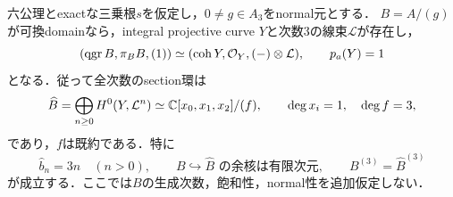 \documentclass[11pt,a4paper]{ltjsarticle}
\begin{document}
\begin{theorem}[可換三次境界の飽和環は平面三次曲線の環である]
\label{thm:v7-commutative-boundary-geometry}
六公理とexactな三乗根$s$を仮定し，$0\ne g\in A_3$をnormal元とする．
$B=A/(g)$が可換domainなら，integral projective curve $Y$と次数$3$の線束$\mathcal L$が存在し，
\begin{equation}\label{eq:v7-commutative-boundary-triple}
 (\operatorname{qgr} B,\pi_BB,(1))
 \simeq(\operatorname{coh}Y,\mathcal O_Y,(-)\otimes\mathcal L),
 \qquad p_a(Y)=1
\end{equation}
となる．従って全次数のsection環は
\[
 \widehat B=\bigoplus_{n\geq0}H^0(Y,\mathcal L^n)
 \simeq\mathbb C[x_0,x_1,x_2]/(f),
 \qquad \deg x_i=1,\quad\deg f=3,
\]
であり，$f$は既約である．特に
\[
 \widehat b_n=3n\quad(n>0),\qquad
 B\hookrightarrow\widehat B\text{ の余核は有限次元},\qquad
 B^{(3)}=\widehat B^{(3)}
\]
が成立する．ここでは$B$の生成次数，飽和性，normal性を追加仮定しない．
\end{theorem}
\end{document}
